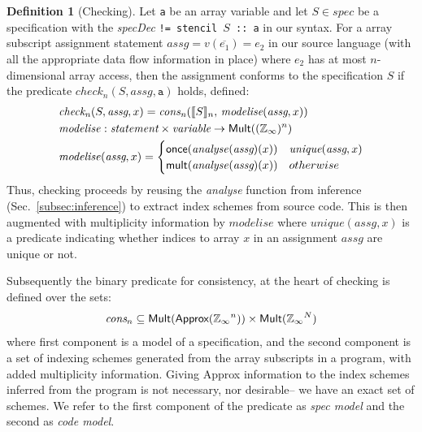 \documentclass[9pt]{sigplanconf}
\newcounter{block}
\theoremstyle{definition}
\newtheorem{definition}[block]{Definition}
\newcommand{\interp}[1]{\llbracket{#1}\rrbracket}
\begin{document}
\begin{definition}[Checking]
Let \texttt{a} be an array variable and let
$S \in \textit{spec}$ be a specification with
the \textit{specDec} \texttt{!= stencil
  $S$ :: a} in our syntax.
For a array subscript
assignment statement $\textit{assg} = v(\overline{e_1}) = e_2$ in our source language
(with all the appropriate data flow information in place)
where $e_2$ has at most $n$-dimensional array access, 
then the assignment conforms to the specification $S$ if 
the predicate $\mathit{check}_n(S, \textit{assg}, \texttt{a})$ holds, 
defined:
\begin{align*}
& \mathit{check_n}(S, \textit{assg}, x) =
  \mathit{cons_n}(\interp{S}_n, \, \textit{modelise}(\textit{assg},
  x)) \\
& \mathit{modelise} : \textit{statement} \times \textit{variable}
  \rightarrow \textsf{Mult}((\domainVal)^n) \\ 
& \mathit{modelise} (\textit{assg}, x) =
  \begin{cases}
    \textsf{once}(\mathit{analyse}(\textit{assg})(x)) & \textit{unique}(\textit{assg},x) \\
    \textsf{mult}(\mathit{analyse}(\textit{assg})(x)) & otherwise
  \end{cases}
\end{align*}
Thus, checking proceeds by reusing the \textit{analyse} function from 
inference (Sec.~\ref{subsec:inference}) to extract index 
schemes from source code. 
This is then augmented with multiplicity information
by $\mathit{modelise}$ where $\mathit{unique}(\textit{assg},x)$ is a
 predicate indicating whether indices to array $x$ in an
assignment $\textit{assg}$ are unique or not. 
\end{definition}

Subsequently the binary predicate for consistency, at the heart of checking
is defined over the sets: 
%
\begin{equation*}
\textit{cons}_n \subseteq \textsf{Mult}(\textsf{Approx}(\mathbb{Z}_\infty{}^n))
\times \textsf{Mult}(\mathbb{Z}_\infty{}^N)
\end{equation*}
%
where first component is a model of a specification,
and the second component is a set of indexing schemes generated from
the array subscripts in a program, with added multiplicity
information. Giving \textsf{Approx} information to the
index schemes inferred from the program is not necessary, nor
desirable-- we have an exact set of schemes. We refer to the first
component of the predicate as \emph{spec model} and the second as \emph{code model}. 
\end{document}
